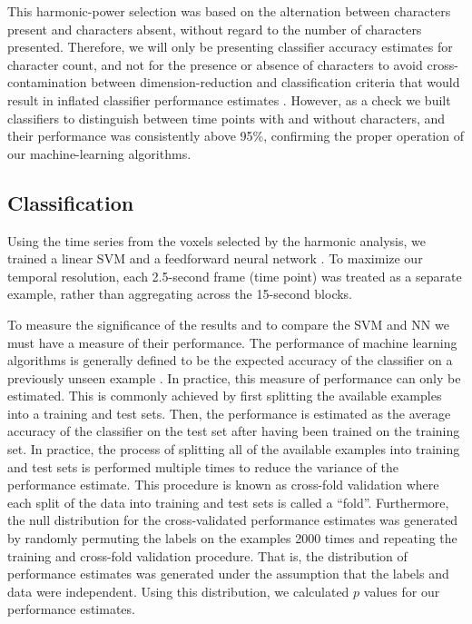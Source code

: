 \documentclass[preprint,5p,authoryear]{elsarticle}
\begin{document}
This harmonic-power selection was based on the alternation between characters present and characters absent, without regard to the number of characters presented. 
Therefore, we will only be presenting classifier accuracy estimates for character count, and not for the presence or absence of characters to avoid cross-contamination between dimension-reduction and  classification criteria that would result in inflated classifier performance estimates \citep{Pereira2009}.
However, as a check we built classifiers to distinguish between time points with and without characters, and their performance was consistently above 95\%, confirming the proper operation of our machine-learning algorithms.

\subsection{Classification}
Using the time series from the voxels selected by the harmonic analysis, we trained a linear SVM \citep{Cortes1995} and a feedforward neural network \citep{Hornik1989,Hagan1994}.
To maximize our temporal resolution, each 2.5-second frame (time point) was treated as a separate example, rather than aggregating across the 15-second blocks.

To measure the significance of the results and to compare the SVM and NN we must have a measure of their performance.
The performance of machine learning algorithms is generally defined to be the expected accuracy of the classifier on a previously unseen example \citep{Bishop2006}.
In practice, this measure of performance can only be estimated.
This is commonly achieved by first splitting the available examples into a training and test sets.
Then, the performance is estimated as the average accuracy of the classifier on the test set after having been trained on the training set.
In practice, the process of splitting all of the available examples into training and test sets is performed multiple times to reduce the variance of the performance estimate.
This procedure is known as cross-fold validation \citep{Kohavi1995} where each split of the data into training and test sets is called a ``fold''.
Furthermore, the null distribution for the cross-validated performance estimates was generated by randomly permuting the labels on the examples 2000 times and repeating the training and cross-fold validation procedure.
That is, the distribution of performance estimates was generated under the assumption that the labels and data were independent.
Using this distribution, we calculated $p$ values for our performance estimates.
\end{document}
